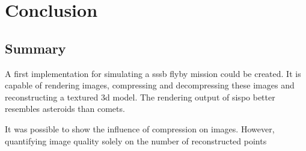 \section{Conclusion} \label{sec:conclusion}
\subsection{Summary}
A first implementation for simulating a \gls{sssb} flyby mission could be created. It is capable of rendering images, compressing and decompressing these images and reconstructing a textured \gls{3d} model.
The rendering output of \gls{sispo} better resembles asteroids than comets.

It was possible to show the influence of compression on images. However, quantifying image quality solely on the number of reconstructed points

